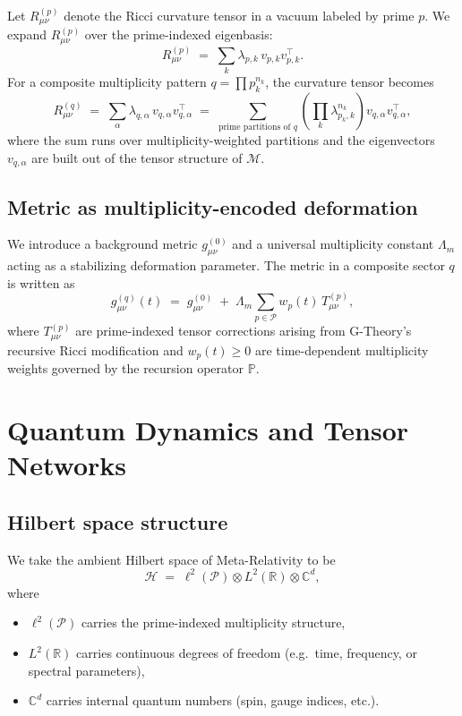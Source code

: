 \documentclass[11pt]{article}
\begin{document}
Let \(R_{\mu\nu}^{(p)}\) denote the Ricci curvature tensor in a vacuum labeled by prime \(p\).
We expand \(R_{\mu\nu}^{(p)}\) over the prime-indexed eigenbasis:
\begin{equation}
  R_{\mu\nu}^{(p)}
  \;=\;
  \sum_{k} \lambda_{p,k}\, v_{p,k} v_{p,k}^\top.
\end{equation}
For a composite multiplicity pattern \(q = \prod p_k^{n_k}\), the curvature tensor becomes
\begin{equation}
  R_{\mu\nu}^{(q)}
  \;=\;
  \sum_{\alpha}
  \lambda_{q,\alpha}\, v_{q,\alpha} v_{q,\alpha}^\top
  \;=\;
  \sum_{\text{prime partitions of } q}
  \left( \prod_k \lambda_{p_k,k}^{n_k} \right) v_{q,\alpha} v_{q,\alpha}^\top,
\end{equation}
where the sum runs over multiplicity-weighted partitions and the eigenvectors \(v_{q,\alpha}\) are built out of the tensor structure of \(\mathcal{M}\).

\subsection{Metric as multiplicity-encoded deformation}

We introduce a background metric \(g^{(0)}_{\mu\nu}\) and a universal multiplicity constant \(\Lambda_m\) acting as a stabilizing deformation parameter.
The metric in a composite sector \(q\) is written as
\begin{equation}
  g^{(q)}_{\mu\nu}(t)
  \;=\;
  g^{(0)}_{\mu\nu}
  \;+\;
  \Lambda_m \sum_{p\in\mathcal{P}} w_p(t)\, T^{(p)}_{\mu\nu},
\end{equation}
where \(T^{(p)}_{\mu\nu}\) are prime-indexed tensor corrections arising from G-Theory's recursive Ricci modification and \(w_p(t) \ge 0\) are time-dependent multiplicity weights governed by the recursion operator \(\mathbb{P}\).

\section{Quantum Dynamics and Tensor Networks}

\subsection{Hilbert space structure}

We take the ambient Hilbert space of Meta-Relativity to be
\begin{equation}
  \mathcal{H}
  \;=\;
  \ell^2(\mathcal{P}) \otimes L^2(\mathbb{R}) \otimes \mathbb{C}^d,
\end{equation}
where
\begin{itemize}
  \item \(\ell^2(\mathcal{P})\) carries the prime-indexed multiplicity structure,
  \item \(L^2(\mathbb{R})\) carries continuous degrees of freedom (e.g.\ time, frequency, or spectral parameters),
  \item \(\mathbb{C}^d\) carries internal quantum numbers (spin, gauge indices, etc.).
\end{itemize}
\end{document}
